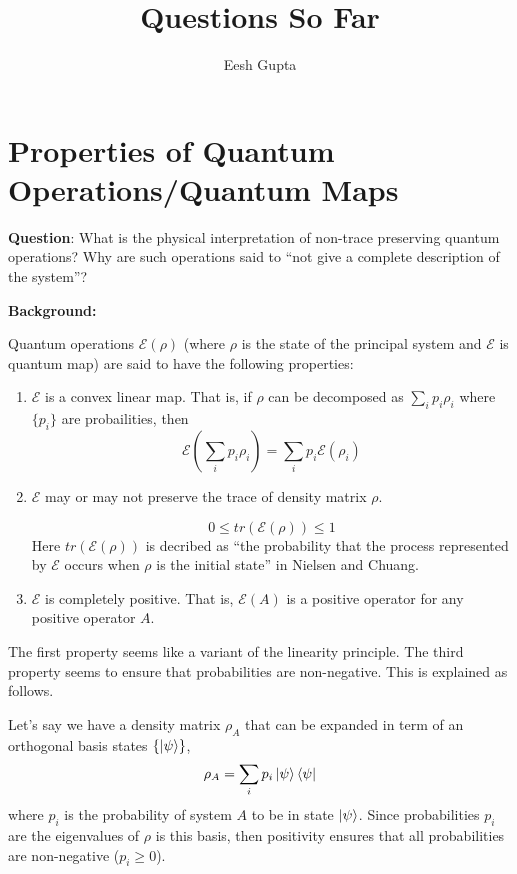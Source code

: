 \documentclass{article}
\title{Questions So Far}
\author{Eesh Gupta}
\begin{document}
\maketitle

\section{Properties of Quantum Operations/Quantum Maps}

\textbf{Question}: What is the physical interpretation of non-trace preserving
quantum operations? Why are such operations said to ``not give a
complete description of the system''?

\noindent \textbf{Background:}


Quantum operations \(\mathcal{E}(\rho)\) (where \(\rho\) is the
state of the principal system and \(\mathcal{E}\) is quantum map)
 are said to have the following properties:
 \begin{enumerate}
   \item \(\mathcal{E}\) is a convex linear map. That is, if \(\rho\) can
   be decomposed as \(\sum_i p_i\rho_i\) where \(\{p_i\}\) are probailities,
   then
   \[\mathcal{E}(\sum_i p_i\rho_i) = \sum_i p_i\mathcal{E}(\rho_i)\]

   \item \(\mathcal{E}\) may or may not preserve the trace of density matrix \(\rho\).


   \[0 \leq tr(\mathcal{E}(\rho)) \leq 1\]
   Here \(tr(\mathcal{E}(\rho))\) is decribed as ``the probability that the process represented by \(\mathcal{E}\) occurs when \(\rho\) is the initial state'' in Nielsen and Chuang. 
   \item \(\mathcal{E}\) is completely positive. That is, \(\mathcal{E}(A)\) is
   a positive operator for any positive operator \(A\).

 \end{enumerate}

The first property seems like a variant of the linearity principle.
The third property seems to ensure that probabilities are
non-negative. This is explained as follows.

 Let's say we have a density matrix \(\rho_A\) that can be expanded in term of
 an orthogonal basis states \(\{\ket{\psi}\}\),
 \[\rho_A = \sum_i p_i\ket{\psi}\bra{\psi}\]
 where \(p_i\) is the probability of system \(A\) to be in state \(\ket{\psi}\).
 Since probabilities \(p_i\) are the eigenvalues of \(\rho\) is this basis, then
 positivity ensures that all probabilities are non-negative (\(p_i\geq 0\)).
\end{document}
